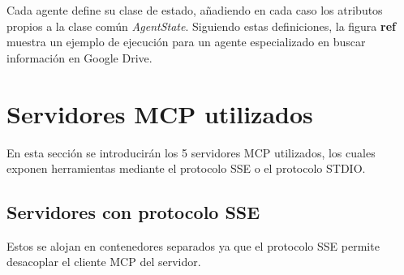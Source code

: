 Cada agente define su clase de estado, añadiendo en cada caso los atributos propios a la clase común \textit{AgentState}. Siguiendo estas definiciones, la figura \textbf{ref} muestra un ejemplo de ejecución para un agente especializado en buscar información en Google Drive.

\section{Servidores MCP utilizados}
En esta sección se introducirán los 5 servidores MCP utilizados, los cuales exponen herramientas mediante el protocolo SSE o el protocolo STDIO. 

\subsection{Servidores con protocolo SSE}
Estos se alojan en contenedores separados ya que el protocolo SSE permite desacoplar el cliente MCP del servidor.
